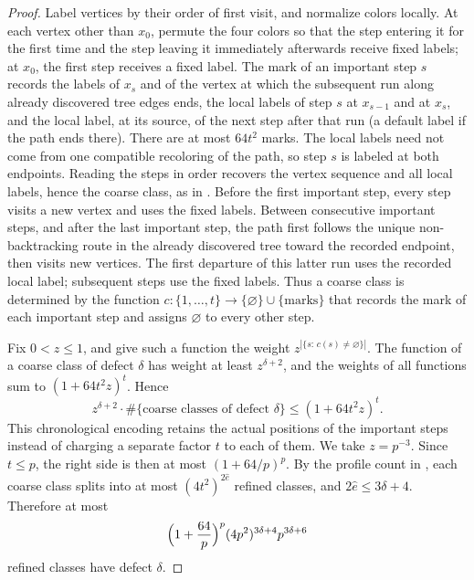 \documentclass[11pt]{article}
\numberwithin{equation}{section}
\theoremstyle{boldremark}\newtheorem{remark}[theorem]{Remark}
\begin{document}
\begin{proof}
Label vertices by their order of first visit, and normalize colors
locally. At each vertex other than $x_0$, permute the four colors so
that the step entering it for the first time and the step leaving it
immediately afterwards receive fixed labels; at $x_0$, the first step
receives a fixed label. The mark of an important step $s$ records the
labels of $x_s$ and of the vertex at which the subsequent run along
already discovered tree edges ends, the local labels of step $s$ at
$x_{s-1}$ and at $x_s$, and the local label, at its source, of the next
step after that run (a default label if the path ends there). There are at most $64t^2$ marks. The local labels need not come from
one compatible recoloring of the path, so step $s$ is labeled at both
endpoints. Reading the steps in order recovers the vertex sequence
and all local labels, hence the coarse class, as in
\cite[proof of Lemma~5.3]{BC}. Before the first important step, every
step visits a new vertex and uses the fixed labels. Between consecutive
important steps, and after the last important step, the path first follows the unique non-backtracking route
in the already discovered tree toward the recorded endpoint, then visits
new vertices. The first departure of this latter run uses the recorded
local label; subsequent steps use the fixed labels. Thus a coarse class
is determined by the function
$c:\{1,\dots,t\}\to\{\varnothing\}\cup\{\text{marks}\}$ that records the mark of each important step and assigns
$\varnothing$ to every other step.

Fix $0<z\le1$, and give such a function the weight
$z^{|\{s:\,c(s)\ne\varnothing\}|}$. The function of a coarse class of
defect $\delta$ has weight at least $z^{\delta+2}$, and the weights of
all functions sum to $(1+64t^2z)^t$. Hence
\[
 z^{\delta+2}\cdot\#\{\text{coarse classes of defect }\delta\}
 \le(1+64t^2z)^t.
\]
This chronological encoding retains the actual positions of the
important steps instead of charging a separate factor $t$ to each of
them. We take $z=p^{-3}$. Since $t\le p$, the right side is then at
most $(1+64/p)^p$. By the profile count in
\cite[proof of Lemma~5.8]{BC}, each coarse class splits into at most
$(4t^2)^{2\hat e}$ refined classes, and $2\hat e\le3\delta+4$.
Therefore at most
\begin{equation}
 \Bigl(1+\frac{64}{p}\Bigr)^p(4p^2)^{3\delta+4}p^{3\delta+6}
 \label{eq:class-count}
\end{equation}
refined classes have defect $\delta$.


\end{proof}
\end{document}
